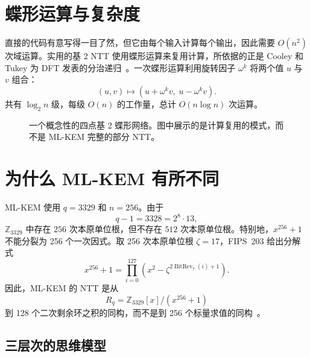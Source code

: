 \section{蝶形运算与复杂度}

直接的代码有意写得一目了然，但它由每个输入计算每个输出，因此需要 $O(n^2)$ 次域运算。实用的基 2 NTT 使用蝶形运算来复用计算，所依据的正是 Cooley 和 Tukey 为 DFT 发表的分治递归~\cite{cooleytukey1965}。一次蝶形运算利用旋转因子 $\omega^k$ 将两个值 $u$ 与 $v$ 组合：
\[
(u,v)\longmapsto(u+\omega^k v,\;u-\omega^k v).
\]
共有 $\log_2n$ 级，每级 $O(n)$ 的工作量，总计 $O(n\log n)$ 次运算。

\begin{figure}[H]
\centering
{}
\caption{一个概念性的四点基 2 蝶形网络。图中展示的是计算复用的模式，而不是 ML-KEM 完整的部分 NTT。}
\label{fig:toy-ntt-butterfly}
\end{figure}

\section{为什么 ML-KEM 有所不同}

ML-KEM 使用 $q=3329$ 和 $n=256$。由于
\[
q-1=3328=2^8\cdot13,
\]
$\mathbb{Z}_{3329}$ 中存在 $256$ 次本原单位根，但不存在 $512$ 次本原单位根。特别地，$x^{256}+1$ 不能分裂为 256 个一次因式。取 256 次本原单位根 $\zeta=17$，FIPS~203 给出分解式
\[
x^{256}+1=\prod_{i=0}^{127}\left(x^2-\zeta^{2\operatorname{BitRev}_7(i)+1}\right).
\]
因此，ML-KEM 的 NTT 是从
\[
R_q=\mathbb{Z}_{3329}[x]/(x^{256}+1)
\]
到 128 个二次剩余环之积的同构，而不是到 256 个标量求值的同构~\cite[Sec.~4.3]{fips203}。

\subsection{三层次的思维模型}

